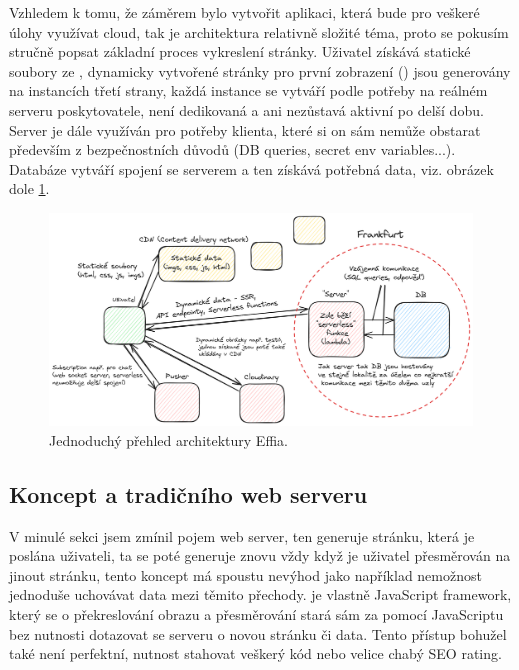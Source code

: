 \documentclass[12pt, a4paper,
openright
]{report}
\begin{document}
Vzhledem k tomu, že záměrem bylo vytvořit aplikaci, která bude pro veškeré  úlohy využívat cloud, tak je architektura relativně složité téma, proto se pokusím stručně popsat základní proces vykreslení stránky. Uživatel získává statické soubory ze , dynamicky vytvořené stránky pro první zobrazení () jsou generovány na instancích  třetí strany, každá instance se vytváří podle potřeby na reálném serveru poskytovatele, není dedikovaná a ani nezůstavá aktivní po delší dobu. Server je dále využíván pro potřeby klienta, které si on sám nemůže obstarat především z bezpečnostních důvodů (DB queries, secret env variables...). Databáze vytváří spojení se serverem a ten získává potřebná data, viz. obrázek dole \ref{fig:effio-architecture}.
\begin{figure}[h!]
	\centering %
	\includegraphics[width=1\linewidth]{image/effio-architecture-simple.png} 
	\caption{Jednoduchý přehled architektury Effia.} %
	\label{fig:effio-architecture} %
\end{figure}

\subsection{Koncept  a tradičního web serveru }
V minulé sekci jsem zmínil pojem web server, ten generuje stránku, která je poslána uživateli, ta se poté generuje znovu vždy když je uživatel přesměrován na jinout stránku, tento koncept má spoustu nevýhod jako například nemožnost jednoduše uchovávat data mezi těmito přechody. je vlastně JavaScript framework, který se o překreslování obrazu a přesměrování stará sám za pomocí JavaScriptu bez nutnosti dotazovat se serveru o novou stránku či data. Tento přístup bohužel také není perfektní, nutnost stahovat veškerý kód nebo velice chabý SEO rating.
\end{document}
